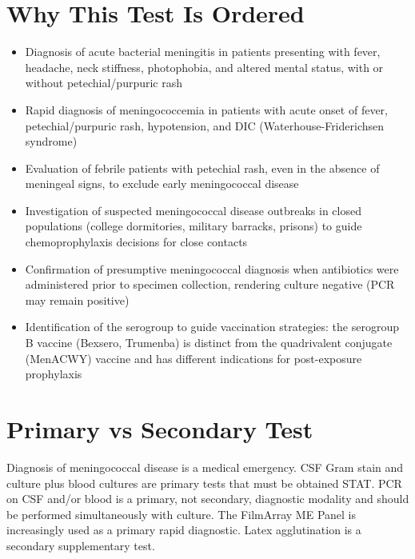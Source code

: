 \section*{Why This Test Is Ordered}
\begin{itemize}
  \item Diagnosis of acute bacterial meningitis in patients presenting with fever, headache, neck stiffness, photophobia, and altered mental status, with or without petechial/purpuric rash
  \item Rapid diagnosis of meningococcemia in patients with acute onset of fever, petechial/purpuric rash, hypotension, and DIC (Waterhouse-Friderichsen syndrome)
  \item Evaluation of febrile patients with petechial rash, even in the absence of meningeal signs, to exclude early meningococcal disease
  \item Investigation of suspected meningococcal disease outbreaks in closed populations (college dormitories, military barracks, prisons) to guide chemoprophylaxis decisions for close contacts
  \item Confirmation of presumptive meningococcal diagnosis when antibiotics were administered prior to specimen collection, rendering culture negative (PCR may remain positive)
  \item Identification of the serogroup to guide vaccination strategies: the serogroup B vaccine (Bexsero, Trumenba) is distinct from the quadrivalent conjugate (MenACWY) vaccine and has different indications for post-exposure prophylaxis
\end{itemize}

\section*{Primary vs Secondary Test}
Diagnosis of meningococcal disease is a medical emergency. CSF Gram stain and culture plus blood cultures are primary tests that must be obtained STAT. PCR on CSF and/or blood is a primary, not secondary, diagnostic modality and should be performed simultaneously with culture. The FilmArray ME Panel is increasingly used as a primary rapid diagnostic. Latex agglutination is a secondary supplementary test.

